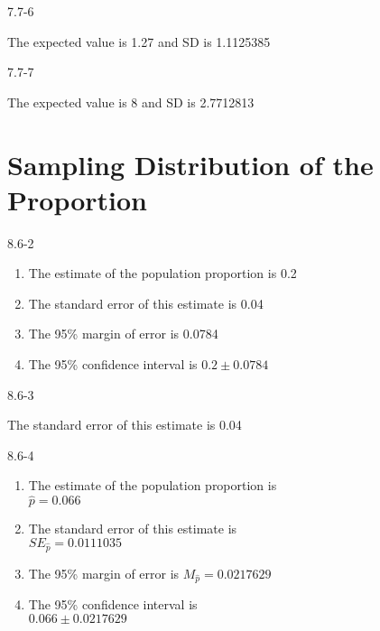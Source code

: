 \begin{exsol@solution}{7.7-6}

The expected value is 1.27 and SD is 1.1125385

\end{exsol@solution}
\begin{exsol@solution}{7.7-7}

The expected value is 8 and SD is 2.7712813
\end{exsol@solution}
\setcounter{chapter}{8}\chapter{Sampling Distribution of the Proportion}
\begin{exsol@solution}{8.6-2}

\begin{enumerate}
\item The estimate of the population proportion is 0.2
\item The standard error of this estimate is 0.04
\item The 95\% margin of error is 0.0784
\item The 95\% confidence interval is $0.2 $
\end{enumerate}
\end{exsol@solution}
\begin{exsol@solution}{8.6-3}

The standard error of this estimate is 0.04

\end{exsol@solution}
\begin{exsol@solution}{8.6-4}

\begin{enumerate}
\item	The estimate of the population proportion is \\ $ = 0.066$
\item	The standard error of this estimate is \\ $SE_{} = 0.0111035$
\item	The 95\% margin of error is $M_{} = 0.0217629$
\item	The 95\% confidence interval is \\ $0.066 $
\end{enumerate}
\end{exsol@solution}

